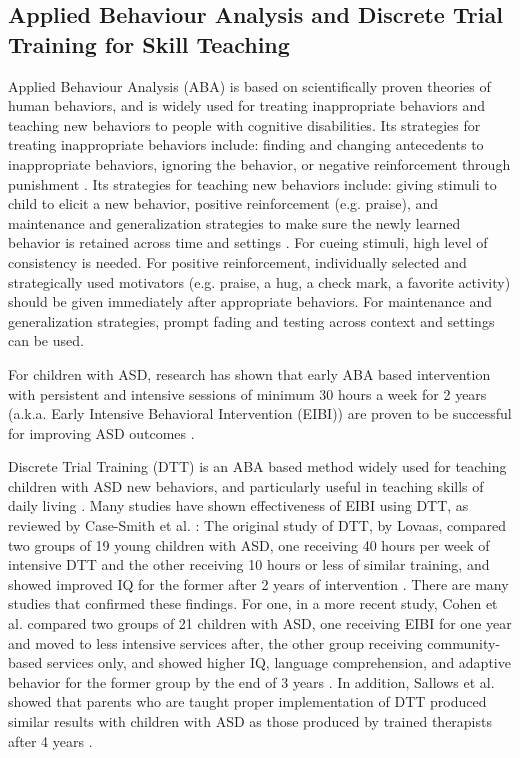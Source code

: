 \documentclass{ut-thesis}
\begin{document}
\subsection{Applied Behaviour Analysis and Discrete Trial Training for Skill Teaching}
Applied Behaviour Analysis (ABA) is based on scientifically proven theories of human behaviors, and is widely used for treating inappropriate behaviors and teaching new behaviors to people with cognitive disabilities.  Its strategies for treating inappropriate behaviors include: finding and changing antecedents to inappropriate behaviors, ignoring the behavior, or negative reinforcement through punishment \cite{foxx1982decreasing}.  Its strategies for teaching new behaviors include: giving stimuli to child to elicit a new behavior, positive reinforcement (e.g. praise), and maintenance and generalization strategies to make sure the newly learned behavior is retained across time and settings \cite{foxx1982decreasing}.  For cueing stimuli, high level of consistency is needed.  For positive reinforcement, individually selected and strategically used motivators (e.g. praise, a hug, a check mark, a favorite activity) should be given immediately after appropriate behaviors.  For maintenance and generalization strategies, prompt fading and testing across context and settings can be used.


For children with ASD, research has shown that early ABA based intervention with persistent and intensive sessions of minimum 30 hours a week for 2 years (a.k.a. Early Intensive Behavioral Intervention (EIBI)) are proven to be successful for improving ASD outcomes \cite{howlin2009systematic}.

Discrete Trial Training (DTT) is an ABA based method widely used for teaching children with ASD new behaviors, and particularly useful in teaching skills of daily living \cite{smith2001discrete}.  Many studies have shown effectiveness of EIBI using DTT, as reviewed by Case-Smith et al. \cite{case2008evidence}: The original study of DTT, by Lovaas, compared two groups of 19 young children with ASD, one receiving 40 hours per week of intensive DTT and the other receiving 10 hours or less of similar training, and showed improved IQ for the former after 2 years of intervention \cite{lovaas1987behavioral}.  There are many studies that confirmed these findings.  For one, in a more recent study, Cohen et al. compared two groups of 21 children with ASD, one receiving EIBI for one year and moved to less intensive services after, the other group receiving community-based services only, and showed higher IQ, language comprehension, and adaptive behavior for the former group by the end of 3 years \cite{cohen2006early}.  In addition, Sallows et al. showed that parents who are taught proper implementation of DTT produced similar results with children with ASD as those produced by trained therapists after 4 years \cite{sallows2005intensive}.
\end{document}
